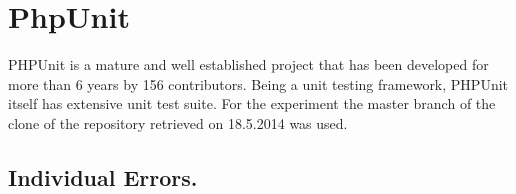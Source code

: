 \section{PhpUnit}
PHPUnit is a mature and well established project that has been 
developed for more than 6 years by 156 contributors. 
Being a unit testing framework, PHPUnit itself has extensive 
unit test suite. For the experiment the master branch of the clone of the 
repository retrieved on 18.5.2014 was used.

\subsection{Individual Errors.}


